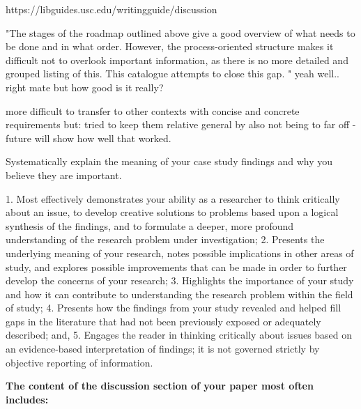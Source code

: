 
https://libguides.usc.edu/writingguide/discussion

"The stages of the roadmap outlined above give a good overview of what needs to be done and in what order. However, the process-oriented structure makes it difficult not to overlook important information, as there is no more detailed and grouped listing of this. This catalogue attempts to close this gap. " yeah well.. right mate but how good is it really?

more difficult to transfer to other contexts with concise and concrete requirements but: tried to keep them relative general by also not being to far off - future will show how well that worked.

Systematically explain the meaning of your case study findings and why you believe they are important. 



1. Most effectively demonstrates your ability as a researcher to think critically about an issue, to develop creative solutions to problems based upon a logical synthesis of the findings, and to formulate a deeper, more profound understanding of the research problem under investigation;
2. Presents the underlying meaning of your research, notes possible implications in other areas of study, and explores possible improvements that can be made in order to further develop the concerns of your research;
3. Highlights the importance of your study and how it can contribute to understanding the research problem within the field of study;
4. Presents how the findings from your study revealed and helped fill gaps in the literature that had not been previously exposed or adequately described; and,
5. Engages the reader in thinking critically about issues based on an evidence-based interpretation of findings; it is not governed strictly by objective reporting of information.


\textbf{The content of the discussion section of your paper most often includes:}

